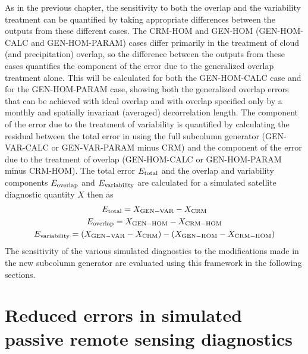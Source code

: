 As in the previous chapter, the sensitivity to both the overlap and the variability treatment can be quantified by taking appropriate differences between the outputs from these different cases. The CRM-HOM and GEN-HOM (GEN-HOM-CALC and GEN-HOM-PARAM) cases differ primarily in the treatment of cloud (and precipitation) overlap, so the difference between the outputs from these cases quantifies the component of the error due to the generalized overlap treatment alone. This will be calculated for both the GEN-HOM-CALC case and for the GEN-HOM-PARAM case, showing both the generalized overlap errors that can be achieved with ideal overlap and with overlap specified only by a monthly and spatially invariant (averaged) decorrelation length. The component of the error due to the treatment of variability is quantified by calculating the residual between the total error in using the full subcolumn generator (GEN-VAR-CALC or GEN-VAR-PARAM minus CRM) and the component of the error due to the treatment of overlap (GEN-HOM-CALC or GEN-HOM-PARAM minus CRM-HOM). The total error $E_{\rm total}$ and the overlap and variability components $E_{\rm overlap}$ and $E_{\rm variability}$ are calculated for a simulated satellite diagnostic quantity $X$ then as
\begin{gather}
E_{\rm total} = X_{\rm GEN-VAR} - X_{\rm CRM} \\
E_{\rm overlap} = X_{\rm GEN-HOM} - X_{\rm CRM-HOM} \\
E_{\rm variability} = (X_{\rm GEN-VAR} - X_{\rm CRM}) - (X_{\rm GEN-HOM} - X_{\rm CRM-HOM})
\end{gather}
The sensitivity of the various simulated diagnostics to the modifications made in the new subcolumn generator are evaluated using this framework in the following sections.

\section{Reduced errors in simulated passive remote sensing diagnostics}
\label{subgrid2_passive_section}

